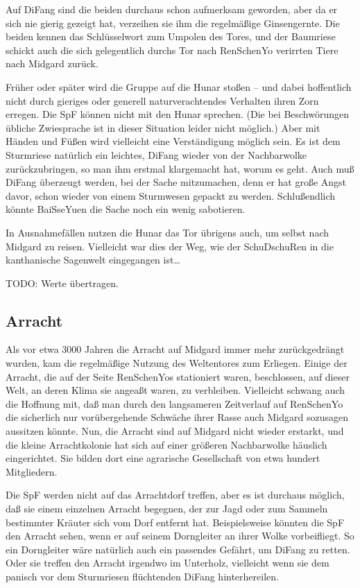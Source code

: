 \documentclass[
a4paper,
twoside,
DIV=calc,
BCOR=4mm,
fontsize=9pt,
twocolumn=on,
titlepage=on,
parskip=half
]{scrartcl}
\begin{document}
Auf DiFang sind die beiden durchaus schon aufmerksam geworden, aber da
er sich nie gierig gezeigt hat, verzeihen sie ihm die regelmäßige
Ginsengernte. Die beiden kennen das Schlüsselwort zum Umpolen des
Tores, und der Baumriese schickt auch die sich gelegentlich durchs Tor
nach RenSchenYo verirrten Tiere nach Midgard zurück.

Früher oder später wird die Gruppe auf die Hunar stoßen -- und dabei
hoffentlich nicht durch gieriges oder generell naturverachtendes
Verhalten ihren Zorn erregen. Die SpF können nicht mit den Hunar
sprechen. (Die bei Beschwörungen übliche Zwiesprache ist in dieser
Situation leider nicht möglich.) Aber mit Händen und Füßen wird
vielleicht eine Verständigung möglich sein. Es ist dem Sturmriese
natürlich ein leichtes, DiFang wieder von der Nachbarwolke
zurückzubringen, so man ihm erstmal klargemacht hat, worum es
geht. Auch muß DiFang überzeugt werden, bei der Sache mitzumachen,
denn er hat große Angst davor, schon wieder von einem Sturmwesen
gepackt zu werden. Schlußendlich könnte BaiSseYuen die Sache noch ein
wenig sabotieren.

In Ausnahmefällen nutzen die Hunar das Tor übrigens auch, um selbst
nach Midgard zu reisen. Vielleicht war dies der Weg, wie der
SchuDschuRen in die kanthanische Sagenwelt eingegangen ist\dots

TODO: Werte übertragen.

\subsection{Arracht}

Als vor etwa 3000 Jahren die Arracht auf Midgard immer mehr
zurückgedrängt wurden, kam die regelmäßige Nutzung des Weltentores zum
Erliegen. Einige der Arracht, die auf der Seite RenSchenYos
stationiert waren, beschlossen, auf dieser Welt, an deren Klima sie
angeaßt waren, zu verbleiben. Vielleicht schwang auch die Hoffnung
mit, daß man durch den langsameren Zeitverlauf auf RenSchenYo die
sicherlich nur vorübergehende Schwäche ihrer Rasse auch Midgard
sozusagen aussitzen könnte. Nun, die Arracht sind auf Midgard nicht
wieder erstarkt, und die kleine Arrachtkolonie hat sich auf einer
größeren Nachbarwolke häuslich eingerichtet. Sie bilden dort eine
agrarische Gesellschaft von etwa hundert Mitgliedern.

Die SpF werden nicht auf das Arrachtdorf treffen, aber es ist durchaus
möglich, daß sie einem einzelnen Arracht begegnen, der zur Jagd oder
zum Sammeln bestimmter Kräuter sich vom Dorf entfernt
hat. Beispielsweise könnten die SpF den Arracht sehen, wenn er auf
seinem Dorngleiter an ihrer Wolke vorbeifliegt. So ein Dorngleiter
wäre natürlich auch ein passendes Gefährt, um DiFang zu retten. Oder
sie treffen den Arracht irgendwo im Unterholz, vielleicht wenn sie dem
panisch vor dem Sturmriesen flüchtenden DiFang hinterhereilen.
\end{document}
